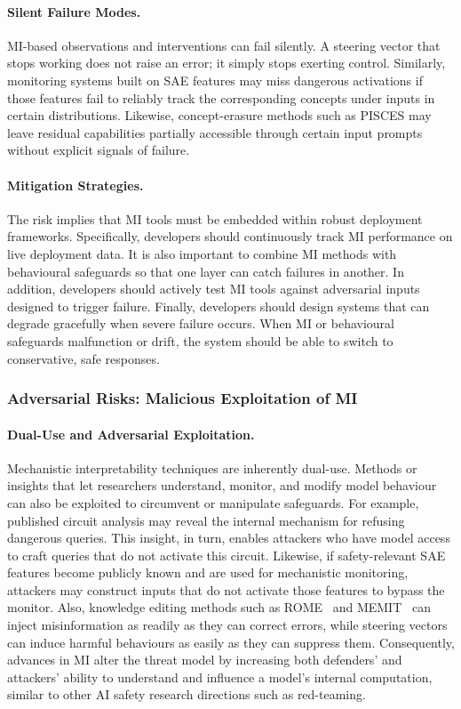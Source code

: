 \paragraph{Silent Failure Modes.}
MI-based observations and interventions can fail silently. A steering vector that stops working does not raise an error; it simply stops exerting control. Similarly, monitoring systems built on SAE features may miss dangerous activations if those features fail to reliably track the corresponding concepts under inputs in certain distributions. Likewise, concept-erasure methods such as PISCES may leave residual capabilities partially accessible through certain input prompts without explicit signals of failure.


\paragraph{Mitigation Strategies.}
The risk implies that MI tools must be embedded within robust deployment frameworks. Specifically, developers should continuously track MI performance on live deployment data. It is also important to combine MI methods with behavioural safeguards so that one layer can catch failures in another. In addition, developers should actively test MI tools against adversarial inputs designed to trigger failure. Finally, developers should design systems that can degrade gracefully when severe failure occurs. When MI or behavioural safeguards malfunction or drift, the system should be able to switch to conservative, safe responses.


\subsubsection{Adversarial Risks: Malicious Exploitation of MI}

\paragraph{Dual-Use and Adversarial Exploitation.}
Mechanistic interpretability techniques are inherently dual-use. Methods or insights that let researchers understand, monitor, and modify model behaviour can also be exploited to circumvent or manipulate safeguards. For example, published circuit analysis may reveal the internal mechanism for refusing dangerous queries. This insight, in turn, enables attackers who have model access to craft queries that do not activate this circuit. Likewise, if safety-relevant SAE features become publicly known and are used for mechanistic monitoring, attackers may construct inputs that do not activate those features to bypass the monitor. Also, knowledge editing methods such as ROME~ and MEMIT~ can inject misinformation as readily as they can correct errors, while steering vectors can induce harmful behaviours as easily as they can suppress them. Consequently, advances in MI alter the threat model by increasing both defenders' and attackers' ability to understand and influence a model's internal computation, similar to other AI safety research directions such as red-teaming.


